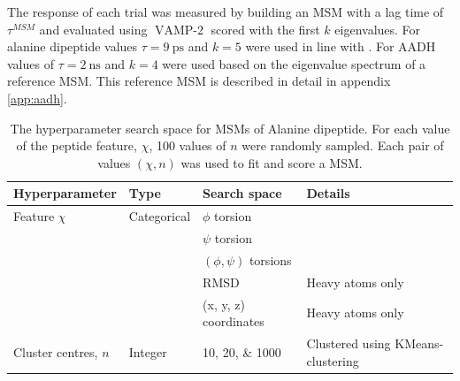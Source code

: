 The response of each trial was measured by building an MSM with a lag time of $\tau^{MSM}$ and evaluated using $\operatorname{VAMP-2}$ scored with the first $k$ eigenvalues. For alanine dipeptide values $\tau=\SI{9}{\pico\second}$ and $k=5$ were used in line with \cite{bowmanQuantitativeComparisonAlternative2013}.  For AADH values of $\tau=\SI{2}{\nano\second}$ and $k=4$ were used based on the eigenvalue spectrum of a reference MSM. This reference MSM is described in detail in appendix \ref{app:aadh}. 

\begin{table}
    \caption{The hyperparameter search space for MSMs of Alanine dipeptide. For each value of the peptide feature, $\chi$, 100 values of $n$ were randomly sampled. Each pair of values $(\chi, n)$ was used to fit and score a MSM.}
    \centering
    \begin{tabularx}{0.9\textwidth}{ |>{\raggedright\arraybackslash}X|l|l| >{\raggedright\arraybackslash}X | } 
    \hline
    \textbf{Hyperparameter} & \textbf{Type} & \textbf{Search space} & \textbf{Details} \\
     \hline\hline
    Feature $\chi$ & Categorical &  $\phi$ torsion &  \\
    & & $\psi$ torsion &  \\ 
    & & $(\phi, \psi)$ torsions &  \\ 
    & & RMSD &  Heavy atoms only\\ 
    & & (x, y, z) coordinates & Heavy atoms only  \\
    \hline 
    Cluster centres, $n$ & Integer & \numlist[list-final-separator = { ... }]{10;20;1000} & Clustered using KMeans-clustering \\
     \hline
    \end{tabularx}
    \label{tab:ala2searchspace}
\end{table}

